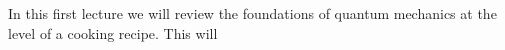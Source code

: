In this first lecture we will review the foundations of quantum mechanics at the level of a cooking recipe. This will 